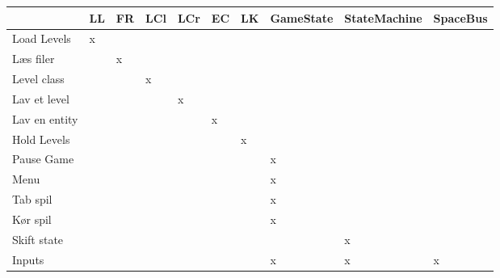\begin{table}[h!]
\centering
\label{my-label}
\begin{tabular}{|l|l|l|l|l|l|l|l|l|l|}
\hline
               & LL & FR & LCl & LCr & EC & LK & GameState & StateMachine & SpaceBus \\\hline

Load Levels   &          x           &            &       &      &              &       &       &       &      \\\hline
Læs filer    &         &              x          &       &      &              &       &       &       &       \\\hline
Level class        &         &             &             x    &      &              &      &       &          &     \\\hline
Lav et level  &         &             &            &       x&                   &       &       &       &       \\\hline
Lav en entity &         &             &            &       &     x &                      &       &       &     \\\hline
Hold Levels   &         &             &            &       &      &x            &            &       & \\\hline
Pause Game &         &             &            &       &      &                      &x       &       &     \\\hline
Menu &         &             &            &       &      &                      &x       &       &     \\\hline
Tab spil &         &             &            &       &      &                      &x       &       &     \\\hline
Kør spil &         &             &            &       &      &                      &x       &       &     \\\hline
Skift state &         &             &            &       &      &                      &       &x       &     \\\hline
Inputs &         &             &            &       &      &                      & x           & x   & x  \\\hline
\end{tabular}
\end{table}

